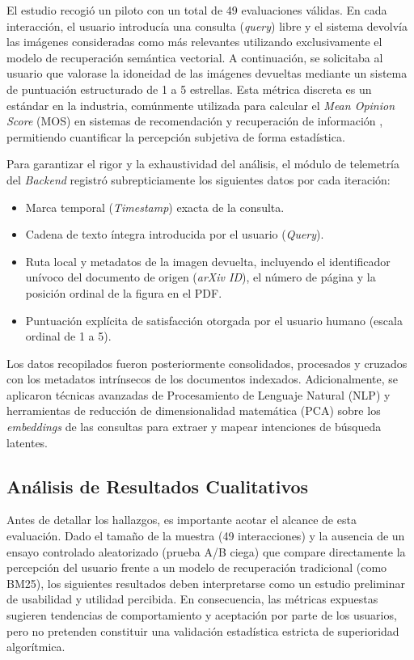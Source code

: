 \documentclass[a4paper]{report}
\begin{document}
El estudio recogió un piloto con un total de 49 evaluaciones válidas. En cada interacción, el usuario introducía una consulta (\textit{query}) libre y el sistema devolvía las imágenes consideradas como más relevantes utilizando exclusivamente el modelo de recuperación semántica vectorial. A continuación, se solicitaba al usuario que valorase la idoneidad de las imágenes devueltas mediante un sistema de puntuación estructurado de 1 a 5 estrellas. Esta métrica discreta es un estándar en la industria, comúnmente utilizada para calcular el \textit{Mean Opinion Score} (MOS) en sistemas de recomendación y recuperación de información \cite{streijl2016mean}, permitiendo cuantificar la percepción subjetiva de forma estadística.

Para garantizar el rigor y la exhaustividad del análisis, el módulo de telemetría del \textit{Backend} registró subrepticiamente los siguientes datos por cada iteración:
\begin{itemize}
    \item Marca temporal (\textit{Timestamp}) exacta de la consulta.
    \item Cadena de texto íntegra introducida por el usuario (\textit{Query}).
    \item Ruta local y metadatos de la imagen devuelta, incluyendo el identificador unívoco del documento de origen (\textit{arXiv ID}), el número de página y la posición ordinal de la figura en el PDF.
    \item Puntuación explícita de satisfacción otorgada por el usuario humano (escala ordinal de 1 a 5).
\end{itemize}

Los datos recopilados fueron posteriormente consolidados, procesados y cruzados con los metadatos intrínsecos de los documentos indexados. Adicionalmente, se aplicaron técnicas avanzadas de Procesamiento de Lenguaje Natural (NLP) y herramientas de reducción de dimensionalidad matemática (PCA) sobre los \textit{embeddings} de las consultas \cite{reimers2019sentence} para extraer y mapear intenciones de búsqueda latentes. 

\subsection{Análisis de Resultados Cualitativos}
\label{sec:eval_cualitativa_resultados}

Antes de detallar los hallazgos, es importante acotar el alcance de esta evaluación. Dado el tamaño de la muestra (49 interacciones) y la ausencia de un ensayo controlado aleatorizado (prueba A/B ciega) que compare directamente la percepción del usuario frente a un modelo de recuperación tradicional (como BM25), los siguientes resultados deben interpretarse como un estudio preliminar de usabilidad y utilidad percibida. En consecuencia, las métricas expuestas sugieren tendencias de comportamiento y aceptación por parte de los usuarios, pero no pretenden constituir una validación estadística estricta de superioridad algorítmica.
\end{document}
